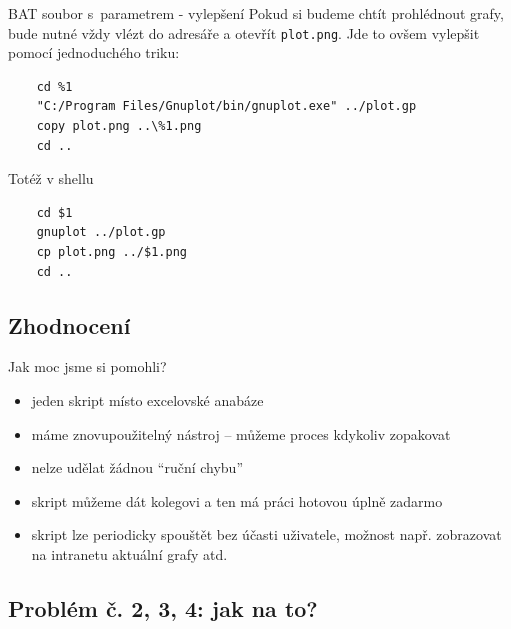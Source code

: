 \documentclass{beamer}
\begin{document}
\begin{frame}[fragile]{BAT soubor s~parametrem - vylepšení}
  Pokud si budeme chtít prohlédnout grafy, bude nutné vždy vlézt do adresáře a otevřít \texttt{plot.png}. Jde to ovšem vylepšit pomocí jednoduchého triku:
{\scriptsize
  \begin{verbatim}
    cd %1
    "C:/Program Files/Gnuplot/bin/gnuplot.exe" ../plot.gp
    copy plot.png ..\%1.png
    cd ..
  \end{verbatim}
  }
\end{frame}

\begin{frame}[fragile]{Totéž v shellu}
  \begin{verbatim}
    cd $1
    gnuplot ../plot.gp
    cp plot.png ../$1.png
    cd ..
  \end{verbatim}
\end{frame}

\subsection{Zhodnocení}

\begin{frame}{Jak moc jsme si pomohli?}
  \begin{itemize}
    \item jeden skript místo excelovské anabáze
    \item máme znovupoužitelný nástroj -- můžeme proces kdykoliv zopakovat
    \item nelze udělat žádnou ``ruční chybu''
    \item skript můžeme dát kolegovi a ten má práci hotovou úplně zadarmo
    \item skript lze periodicky spouštět bez účasti uživatele, možnost např. zobrazovat na intranetu aktuální grafy atd.
  \end{itemize}
\end{frame}

\subsection{Problém č. 2, 3, 4: jak na to?}
\end{document}
